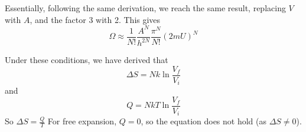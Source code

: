 \documentclass[answers]{exam}
\begin{document}
\begin{questions}
\begin{solution}
    Essentially, following the same derivation, we reach the same result, replacing $V$ with $A$, and the factor 3 with 2. This gives
    $$\Omega \approx \frac{1}{N!}\frac{A^N}{h^{2N}} \frac{\pi^N}{N!}(2mU)^N$$
\end{solution}


\begin{solution}
    Under these conditions, we have derived that
    $$\Delta S = Nk\ln\frac{V_f}{V_i}$$
    and
    $$Q = NkT\ln\frac{V_f}{V_i}$$
    So $\Delta S = \frac{Q}{T}$
    For free expansion, $Q=0$, so the equation does not hold (as $\Delta S \neq 0$).
\end{solution}

\end{questions}
\end{document}
